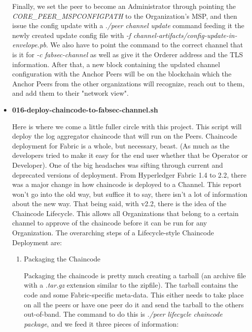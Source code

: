 \begin{itemize}
					\hspace{10mm}Finally, we set the peer to become an Administrator through pointing the \textit{CORE\_PEER\_MSPCONFIGPATH} to the Organization's MSP, and then issue the config update with a \textit{./peer channel update} command feeding it the newly created update config file with \textit{-f channel-artifacts/config-update-in-envelope.pb}. We also have to point the command to the correct channel that is it for \textit{-c fabsec-channel} as well as give it the Orderer address and the TLS information. After that, a new block containing the updated channel configuration with the Anchor Peers will be on the blockchain which the Anchor Peers from the other organizations will recognize, reach out to them, and add them to their "network view".
					
				\item \textbf{016-deploy-chaincode-to-fabsec-channel.sh}
					
					\hspace{10mm}Here is where we come a little fuller circle with this project. This script will deploy the log aggregator chaincode that will run on the Peers. Chaincode deployment for Fabric is a whole, but necessary, beast. (As much as the developers tried to make it easy for the end user whether that be Operator or Developer). One of the big headaches was sifting through current and deprecated versions of deployment. From Hyperledger Fabric 1.4 to 2.2, there was a major change in how chaincode is deployed to a Channel. This report won't go into the old way, but suffice it to say, there isn't a lot of information about the new way. That being said, with v2.2, there is the idea of the Chaincode Lifecycle. This allows all Organizations that belong to a certain channel to approve of the chaincode before it can be run for any Organization. The overarching steps of a Lifecycle-style Chaincode Deployment are:
					
						\begin{enumerate}
							\item Packaging the Chaincode
							
								\hspace{10mm}Packaging the chaincode is pretty much creating a tarball (an archive file with a \textit{.tar.gz} extension similar to the zipfile). The tarball contains the code and some Fabric-specific meta-data. This either needs to take place on all the peers or have one peer do it and send the tarball to the others out-of-band. The command to do this is \textit{./peer lifecycle chaincode package}, and we feed it three pieces of information:
								

\end{enumerate}
\end{itemize}

